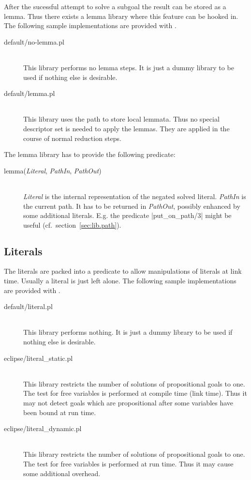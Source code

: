 After the sucessful attempt to solve a subgoal the result can be stored as a
lemma. Thus there exists a lemma library where this feature can be hooked in.
The following sample implementations are provided with \ProCom.
\begin{description}
  \item [default/no-lemma.pl]\ \\
    This library performs no lemma steps. It is just a dummy library to be
    used if nothing else is desirable.
  \item [default/lemma.pl]\ \\
    This library uses the path to store local lemmata. Thus no special
    \CaPrI{} descriptor set is needed to apply the lemmas. They are applied in
    the course of normal reduction steps.
\end{description}

The lemma library has to provide the following predicate:
\begin{description}
  \item [lemma({\em Literal}, {\em PathIn}, {\em PathOut})]\ \\
    {\em Literal}\/ is the internal representation of the negated 
    solved literal. {\em PathIn}\/ is the current path. It has to be returned
    in {\em PathOut}, possibly enhanced by some additional literals. E.g. the
    predicate |put_on_path/3| might be useful (cf.\
    section~\ref{sec:lib.path}).
\end{description}


\subsection{Literals}\label{sec:lib.literal}

The literals are packed into a predicate to allow manipulations of literals at
link time. Usually a literal is just left alone.
The following sample implementations are provided with \ProCom.
\begin{description}
  \item [default/literal.pl]\ \\
    This library performs nothing. It is just a dummy library to be
    used if nothing else is desirable.
  \item [eclipse/literal\_static.pl]\ \\
    This library restricts the number of solutions of propositional goals to
    one. The test for free variables is performed at compile time (link
    time). Thus it may not detect goals which are propositional after some
    variables have been bound at run time.
  \item [eclipse/literal\_dynamic.pl]\ \\
    This library restricts the number of solutions of propositional goals to
    one. The test for free variables is performed at run time. Thus it may
    cause some additional overhead.
\end{description}

